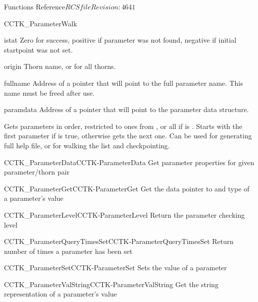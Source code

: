 \begin{cactuspart}{ Functions Reference}{$RCSfile$}{$Revision: 4641 $}
\begin{FunctionDescription}{CCTK\_ParameterWalk}
\begin{ResultSection}
\begin{Result}{istat}
Zero for success, positive if parameter was not found, negative if
initial startpoint was not set.
\end{Result}
\end{ResultSection}

\begin{ParameterSection}
\begin{Parameter}{origin}
Thorn name, or  for all thorns.
\end{Parameter}
\begin{Parameter}{fullname}
Address of a pointer that will point to the full parameter name.  This
name must be freed after use.
\end{Parameter}
\begin{Parameter}{paramdata}
Address of a pointer that will point to the parameter data structure.
\end{Parameter}
\end{ParameterSection}

\begin{Discussion}
Gets parameters in order, restricted to ones from , or
all if  is .  Starts with the first parameter
if  is true, otherwise gets the next one.  Can be used for
generating full help file, or for walking the list and checkpointing.
\end{Discussion}

\begin{SeeAlsoSection}
\begin{SeeAlso2}{CCTK\_ParameterData}{CCTK-ParameterData}
  Get parameter properties for given parameter/thorn pair
\end{SeeAlso2}
\begin{SeeAlso2}{CCTK\_ParameterGet}{CCTK-ParameterGet}
  Get the data pointer to and type of a parameter's value
\end{SeeAlso2}
\begin{SeeAlso2}{CCTK\_ParameterLevel}{CCTK-ParameterLevel}
  Return the parameter checking level
\end{SeeAlso2}
\begin{SeeAlso2}{CCTK\_ParameterQueryTimesSet}{CCTK-ParameterQueryTimesSet}
  Return number of times a parameter has been set
\end{SeeAlso2}
\begin{SeeAlso2}{CCTK\_ParameterSet}{CCTK-ParameterSet}
  Sets the value of a parameter
\end{SeeAlso2}
\begin{SeeAlso2}{CCTK\_ParameterValString}{CCTK-ParameterValString}
  Get the string representation of a parameter's value
\end{SeeAlso2}
\end{SeeAlsoSection}


\end{FunctionDescription}
\end{cactuspart}
